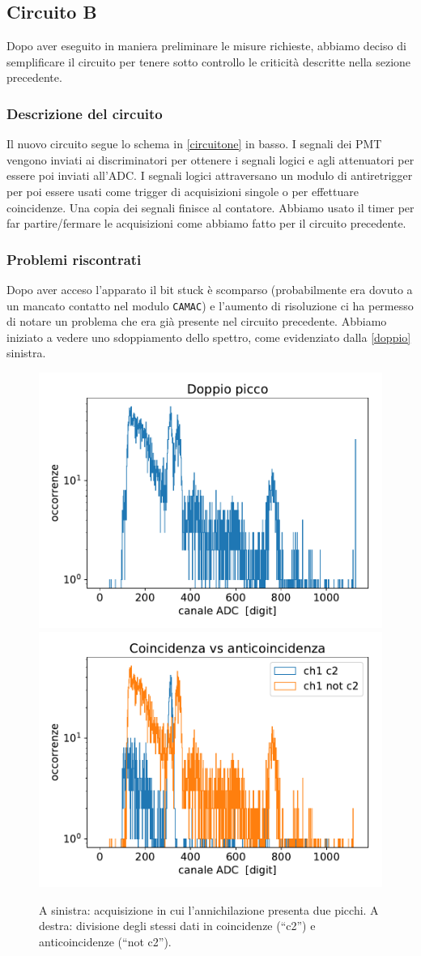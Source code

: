 \subsection{Circuito B}

Dopo aver eseguito in maniera preliminare le misure richieste, abbiamo deciso di semplificare il circuito per tenere sotto controllo le criticità descritte nella sezione precedente.

\subsubsection{Descrizione del circuito}

Il nuovo circuito segue lo schema in \autoref{circuitone} in basso.
I segnali dei PMT vengono inviati ai discriminatori per ottenere i segnali logici e agli attenuatori per essere poi inviati all'ADC. I segnali logici attraversano un modulo di antiretrigger per poi essere usati come trigger di acquisizioni singole o per effettuare coincidenze. Una copia dei segnali finisce al contatore. Abbiamo usato il timer per far partire/fermare le acquisizioni come abbiamo fatto per il circuito precedente.

\subsubsection{Problemi riscontrati}
\label{ref}
Dopo aver acceso l'apparato il bit stuck è scomparso
(probabilmente era dovuto a un mancato contatto nel modulo \texttt{CAMAC})
e l'aumento di risoluzione ci ha permesso di notare un problema che era già presente nel circuito precedente.
Abbiamo iniziato a vedere uno sdoppiamento dello spettro, come evidenziato dalla \autoref{doppio} sinistra. 

\begin{figure}
\centering
\subfloat
{
\includegraphics[width=18 em]{immagini/doppio}
}
\subfloat
{
\includegraphics[width=18 em]{immagini/sdoppio}
}
\caption{A sinistra: acquisizione in cui l'annichilazione presenta due picchi.
A destra: divisione degli stessi dati in coincidenze (``c2'') e anticoincidenze (``not c2'').}
\label{doppio}
\end{figure}

